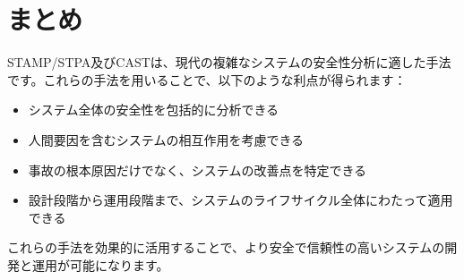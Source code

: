 \section{まとめ}

STAMP/STPA及びCASTは、現代の複雑なシステムの安全性分析に適した手法です。これらの手法を用いることで、以下のような利点が得られます：

\begin{itemize}
    \item システム全体の安全性を包括的に分析できる
    \item 人間要因を含むシステムの相互作用を考慮できる
    \item 事故の根本原因だけでなく、システムの改善点を特定できる
    \item 設計段階から運用段階まで、システムのライフサイクル全体にわたって適用できる
\end{itemize}

これらの手法を効果的に活用することで、より安全で信頼性の高いシステムの開発と運用が可能になります。

